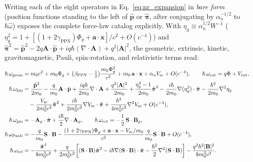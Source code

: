 \documentclass[aps,prd,onecolumn,tightenlines,nofootinbib,notitlepage,10pt,floatfix]{revtex4-2}
\theoremstyle{indentedtheorem}
\begin{document}
Writing each of the eight operators in Eq.~\eqref{eq:nr_expansion} in \emph{bare form} (position functions standing to the left of $\hat{\mathbf{p}}$ or $\hat{\boldsymbol{\pi}}$, after conjugating by $\alpha_n^{-1/2}$ to $\hbar\hat{\omega}$) exposes the complete force-law catalog explicitly. With $\eta_g\equiv\alpha_n^{1/2}W^{-1}$ ($\eta_g^2=1+[(1+2\gamma_\text{PPN})\Phi_g+\mathbf{a}\cdot\mathbf{x}]/c^2+O(c^{-4})$) and $\hat{\boldsymbol{\pi}}^2=\hat{\mathbf{p}}^2-2q\mathbf{A}\cdot\hat{\mathbf{p}}+iq\hbar(\nabla\cdot\mathbf{A})+q^2|\mathbf{A}|^2$, the geometric, extrinsic, kinetic, gravitomagnetic, Pauli, spin-rotation, and relativistic terms read:
\begin{align}
    \hbar\,\omega_\text{geom} &= m_0 c^2 + m_0\Phi_g + \big(\beta_\text{PPN}-\tfrac{1}{2}\big)\frac{m_0\Phi_g^2}{c^2} + m_0\,\mathbf{a}\cdot\mathbf{x} + \alpha_n V_\text{sc} + O(c^{-4}) , \qquad \hbar\,\omega_\text{ext} = q\Phi + V_\text{ext} , \label{eq:geom_expanded} \\
    \hbar\,\omega_\text{kin} &= \frac{\hat{\mathbf{p}}^2}{2m_0} - \frac{q}{m_0}\mathbf{A}\cdot\hat{\mathbf{p}} + \frac{iq\hbar}{2m_0}\nabla\cdot\mathbf{A} + \frac{q^2|\mathbf{A}|^2}{2m_0} + \frac{\eta_g^2-1}{2m_0}\hat{\boldsymbol{\pi}}^2 - \frac{i\hbar}{2m_0}\nabla(\eta_g^2)\cdot\hat{\boldsymbol{\pi}} - \frac{\hbar^2}{2m_0}\nabla^2\eta_g \notag\\
    &\quad - \frac{V_\text{sc}}{2m_0^2 c^2}\hat{\boldsymbol{\pi}}^2 + \frac{i\hbar}{2m_0^2 c^2}\nabla V_\text{sc}\cdot\hat{\boldsymbol{\pi}} + \frac{\hbar^2}{4m_0^2 c^2}\nabla^2 V_\text{sc} + O(c^{-4}) , \label{eq:kin_expanded} \\
    \hbar\,\omega_\text{gm} &= -\mathbf{A}_g\cdot\hat{\boldsymbol{\pi}} + \frac{i\hbar}{2}\nabla\cdot\mathbf{A}_g , \qquad \hbar\,\omega_\text{rot} = -\frac{1}{2}\,\mathbf{S}\cdot\mathbf{B}_g , \label{eq:gm_expanded} \\
    \hbar\,\omega_\text{Pauli} &= -\frac{q}{m_0}\mathbf{S}\cdot\mathbf{B} - \frac{(1+2\gamma_\text{PPN})\Phi_g+\mathbf{a}\cdot\mathbf{x}-V_\text{sc}/m_0}{c^2}\frac{q}{m_0}\mathbf{S}\cdot\mathbf{B} + O(c^{-4}) , \label{eq:pauli_expanded} \\
    \hbar\,\omega_\text{rel} &= -\frac{\hat{\boldsymbol{\pi}}^4}{8m_0^3 c^2} + \frac{q}{2m_0^3 c^2}\!\left[(\mathbf{S}\cdot\mathbf{B})\hat{\boldsymbol{\pi}}^2 - i\hbar\nabla(\mathbf{S}\cdot\mathbf{B})\cdot\hat{\boldsymbol{\pi}} - \frac{\hbar^2}{2}\nabla^2(\mathbf{S}\cdot\mathbf{B})\right] - \frac{q^2\hbar^2|\mathbf{B}|^2}{8m_0^3 c^2} . \label{eq:rel_expanded}
\end{align}
\end{document}

